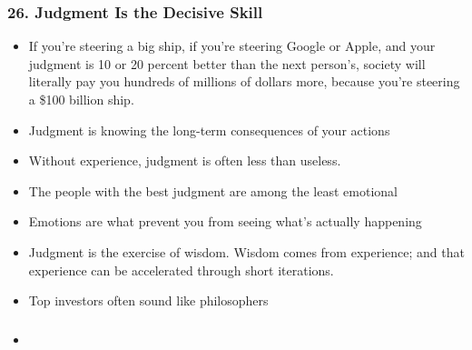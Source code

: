 \begin{frame}[fragile]
\frametitle{26. Judgment Is the Decisive Skill}
\begin{itemize}
\item If you’re steering a big ship, if you’re steering Google or Apple, and your judgment is 10 or 20 percent better than the next person’s, society will literally pay you hundreds of millions of dollars more, because you’re steering a \$100 billion ship.
\item Judgment is knowing the long-term consequences of your actions
\item Without experience, judgment is often less than useless.
\item The people with the best judgment are among the least emotional
\item Emotions are what prevent you from seeing what’s actually happening
\item Judgment is the exercise of wisdom. Wisdom comes from experience; and that experience can be accelerated through short iterations.
\item Top investors often sound like philosophers


\end{itemize}
\end{frame}


\begin{frame}[fragile]
\frametitle{}
\begin{itemize}
\item 
\end{itemize}
\end{frame}
